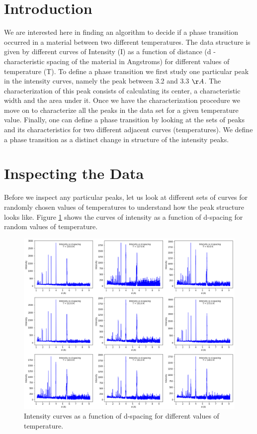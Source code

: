 

\section{Introduction} \label{Intro}
	We are interested here in finding an algorithm to decide if a phase transition occurred in a material between two different temperatures. The data structure is given by different curves of Intensity (I) as a function of distance (d - characteristic spacing of the material in Angstroms) for different values of temperature (T).
To define a phase transition we first study one particular peak in the intensity curves, namely the peak between 3.2 and 3.3 ${\AA}$. The characterization of this peak consists of calculating its center, a characteristic width and the area under it.
Once we have the characterization procedure we move on  to characterize all the peaks in the data set for a given temperature value. Finally, one can define a phase transition by looking at the sets of peaks and its characteristics for two different adjacent curves (temperatures). We define a phase transition as a distinct change in structure of the intensity peaks.

\section{Inspecting the Data} \label{Data}
	Before we inspect any particular peaks, let us look at different sets of curves for randomly chosen values of temperatures to understand how the peak structure looks like. Figure \ref{fig:randTs}  shows the curves of intensity as a function of d-spacing for random values of temperature.

\begin{figure}[h]
  \centering
  \includegraphics[scale=0.3]{../poster/figs/Icurves.png}
  \caption{Intensity curves as a function of d-spacing for different values of temperature.}
  \label{fig:randTs}
\end{figure}

